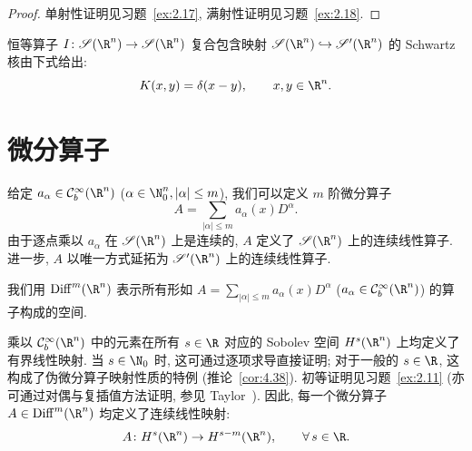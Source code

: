 \begin{proof}
单射性证明见习题~\ref{ex:2.17}, 满射性证明见习题~\ref{ex:2.18}.
\end{proof}

\begin{example}\label{eg:2.20}
恒等算子 $I \colon \Schwartz(\R^n) \to \Schwartz(\R^n)$ 复合包含映射 $\Schwartz(\R^n) \hookrightarrow \TempDistr(\R^n)$ 的 Schwartz 核由下式给出:
\begin{equation}\label{eq:2.51}
    K(x, y) = \delta(x - y), \qquad x, y \in \R^n.
\end{equation}
\end{example}

\section{微分算子}\label{sec:2.5}
%
%
%

给定 $a_\alpha \in \mathcal{C}_b^\infty(\R^n)$ ($\alpha \in \N_0^n, |\alpha| \le m$), 我们可以定义 $m$ 阶微分算子
\begin{equation}\label{eq:2.52}
    A = \sum_{|\alpha| \le m} a_\alpha(x) D^\alpha.
\end{equation}
由于逐点乘以 $a_\alpha$ 在 $\Schwartz(\R^n)$ 上是连续的, $A$ 定义了 $\Schwartz(\R^n)$ 上的连续线性算子. 进一步, $A$ 以唯一方式延拓为 $\TempDistr(\R^n)$ 上的连续线性算子.

\begin{definition}[微分算子空间]\label{def:2.21}
我们用 $\Diff^m(\R^n)$ 表示所有形如 $A = \sum_{|\alpha| \le m} a_\alpha(x) D^\alpha$ ($a_\alpha \in \mathcal{C}_b^\infty(\R^n)$) 的算子构成的空间.
\end{definition}

乘以 $\mathcal{C}_b^\infty(\R^n)$ 中的元素在所有 $s \in \R$ 对应的 Sobolev 空间 $H^s(\R^n)$ 上均定义了有界线性映射. 当 $s \in \N_0$ 时, 这可通过逐项求导直接证明; 对于一般的 $s \in \R$, 这构成了伪微分算子映射性质的特例 (推论~\ref{cor:4.38}). 初等证明见习题~\ref{ex:2.11} (亦可通过对偶与复插值方法证明, 参见 Taylor~\cite[第 4.2 章]{Tay11a}). 因此, 每一个微分算子 $A \in \Diff^m(\R^n)$ 均定义了连续线性映射:
\[
    A \colon H^s(\R^n) \to H^{s-m}(\R^n), \qquad \forall\,s \in \R.
\]

